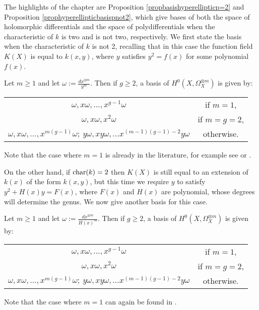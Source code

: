 The highlights of the chapter are Proposition \ref{propbasishyperellipticp=2} and Proposition \ref{prophyperellipticbasispnot2}, which give bases of both the space of holomorphic differentials and the space of polydifferentials when the characteristic of $k$ is two and is not two, respectively.
We first state the basis when the characteristic of $k$ is not 2, recalling that in this case the function field $K(X)$ is equal to $k(x,y)$, where $y$ satisfies $y^2 = f(x)$ for some polynomial $f(x)$.
    \begin{unnumprop}
    Let $m\geq 1$ and let $\omega := \frac{dx^{\otimes m}}{y^m}$. 
    Then if $g\geq 2$, a basis of $H^0(X,\Omega_X^{\otimes m})$ is given by:\\
        \begin{tabular}{c c}
        $\omega, x\omega, \ldots , x^{g-1}\omega$ &  if $m=1$, \\
        $\omega, x\omega, x^2\omega$  &  if $m=g=2$, \\
        $\omega, x\omega, \ldots, x^{m(g-1)}\omega;\  y\omega, xy\omega, \ldots x^{(m-1)(g-1)-2}y\omega$ &  otherwise.
        \end{tabular}
    \end{unnumprop}
    
Note that the case where $m=1$ is already in the literature, for example see \cite[Prop. 7.4.26]{liu} or \cite[Ch. IV, \S 4, Prop. 4.3]{griffiths}.
 
On the other hand, if $\operatorname{char}(k) = 2$ then $K(X)$ is still equal to an extension of $k(x)$ of the form $k(x,y)$, but this time we require $y$ to satisfy $y^2 + H(x)y = F(x)$, where $F(x)$ and $H(x)$ are polynomial, whose degrees will determine the genus.
We now give another basis for this case.
    \begin{unnumprop}
    Let $m\geq 1$ and let $\omega:= \frac{dx^{\otimes m}}{H(x)^m}$. 
    Then if $g\geq 2$, a basis of $H^0(X,\Omega_X^{\otimes m})$ is given by:\\
        \begin{tabular}{c c}
        $\omega, x\omega, \ldots , x^{g-1}\omega$ &  if $m=1$, \\
        $\omega, x\omega, x^2\omega$ & if $m=g=2$, \\
        $\omega, x\omega, \ldots, x^{m(g-1)}\omega;\  y\omega, xy\omega, \ldots x^{(m-1)(g-1)-2}y\omega$ & otherwise.
        \end{tabular}
    \end{unnumprop}
    
Note that the case where $m=1$ can again be found in \cite[Prop. 7.4.26]{liu}.

